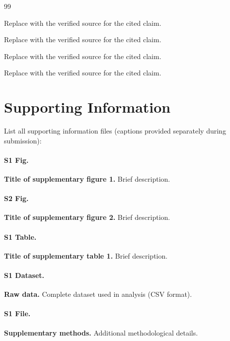\documentclass[10pt,letterpaper]{article}
\begin{document}
% 
% 

\begin{thebibliography}{99}

Replace with the verified source for the cited claim.

Replace with the verified source for the cited claim.

Replace with the verified source for the cited claim.

Replace with the verified source for the cited claim.

\end{thebibliography}

\section*{Supporting Information}

List all supporting information files (captions provided separately during submission):

\paragraph{S1 Fig.}
\textbf{Title of supplementary figure 1.} Brief description.

\paragraph{S2 Fig.}
\textbf{Title of supplementary figure 2.} Brief description.

\paragraph{S1 Table.}
\textbf{Title of supplementary table 1.} Brief description.

\paragraph{S1 Dataset.}
\textbf{Raw data.} Complete dataset used in analysis (CSV format).

\paragraph{S1 File.}
\textbf{Supplementary methods.} Additional methodological details.
\end{document}
